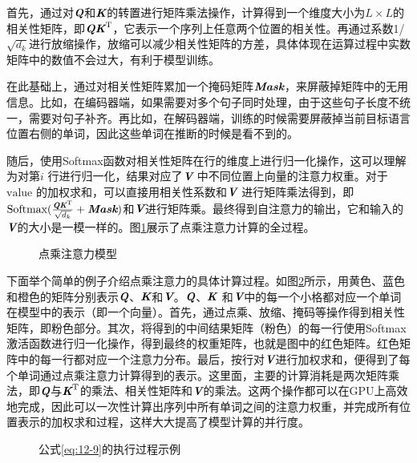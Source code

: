 \noindent 首先，通过对$\textbf{\em Q}$和$\textbf{\em K}$的转置进行矩阵乘法操作，计算得到一个维度大小为$L \times L$的相关性矩阵，即$\textbf{\em Q}\textbf{\em K}^{\textrm{T}}$，它表示一个序列上任意两个位置的相关性。再通过系数1/$\sqrt{d_k}$进行放缩操作，放缩可以减少相关性矩阵的方差，具体体现在运算过程中实数矩阵中的数值不会过大，有利于模型训练。

\parinterval 在此基础上，通过对相关性矩阵累加一个掩码矩阵$\textbf{\em Mask}$，来屏蔽掉矩阵中的无用信息。比如，在编码器端，如果需要对多个句子同时处理，由于这些句子长度不统一，需要对句子补齐。再比如，在解码器端，训练的时候需要屏蔽掉当前目标语言位置右侧的单词，因此这些单词在推断的时候是看不到的。

\parinterval 随后，使用Softmax函数对相关性矩阵在行的维度上进行归一化操作，这可以理解为对第$i$ 行进行归一化，结果对应了$\textbf{\em V}$ 中不同位置上向量的注意力权重。对于$\mathrm{value}$ 的加权求和，可以直接用相关性系数和$\textbf{\em V}$ 进行矩阵乘法得到，即$\textrm{Softmax}
 ( \frac{\textbf{\em Q}\textbf{\em K}^{\textrm{T}}} {\sqrt{d_k}} + \textbf{\em Mask} )$和$\textbf{\em V}$进行矩阵乘。最终得到自注意力的输出，它和输入的$\textbf{\em V}$的大小是一模一样的。图\ref{fig:12-10}展示了点乘注意力计算的全过程。

\begin{figure}[htp]
\centering

\caption{点乘注意力模型 }
\label{fig:12-10}
\end{figure}

\parinterval 下面举个简单的例子介绍点乘注意力的具体计算过程。如图\ref{fig:12-11}所示，用黄色、蓝色和橙色的矩阵分别表示$\textbf{\em Q}$、$\textbf{\em K}$和$\textbf{\em V}$。$\textbf{\em Q}$、$\textbf{\em K}$ 和$\textbf{\em V}$中的每一个小格都对应一个单词在模型中的表示（即一个向量）。首先，通过点乘、放缩、掩码等操作得到相关性矩阵，即粉色部分。其次，将得到的中间结果矩阵（粉色）的每一行使用Softmax激活函数进行归一化操作，得到最终的权重矩阵，也就是图中的红色矩阵。红色矩阵中的每一行都对应一个注意力分布。最后，按行对$\textbf{\em V}$进行加权求和，便得到了每个单词通过点乘注意力计算得到的表示。这里面，主要的计算消耗是两次矩阵乘法，即$\textbf{\em Q}$与$\textbf{\em K}^{\textrm{T}}$的乘法、相关性矩阵和$\textbf{\em V}$的乘法。这两个操作都可以在GPU上高效地完成，因此可以一次性计算出序列中所有单词之间的注意力权重，并完成所有位置表示的加权求和过程，这样大大提高了模型计算的并行度。

\begin{figure}[htp]
\centering

\caption{公式\eqref{eq:12-9}的执行过程示例}
\label{fig:12-11}
\end{figure}

